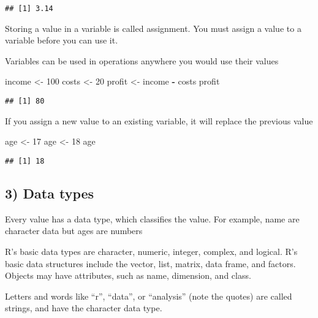 \documentclass[
]{article}
\newenvironment{Shaded}{\begin{snugshade}}{\end{snugshade}}
\newcommand{\DecValTok}[1]{\textcolor[rgb]{0.00,0.00,0.81}{#1}}
\newcommand{\NormalTok}[1]{#1}
\newcommand{\OperatorTok}[1]{\textcolor[rgb]{0.81,0.36,0.00}{\textbf{#1}}}
\newcommand{\StringTok}[1]{\textcolor[rgb]{0.31,0.60,0.02}{#1}}
\begin{document}
\begin{verbatim}
## [1] 3.14
\end{verbatim}

Storing a value in a variable is called assignment. You must assign a
value to a variable before you can use it.

Variables can be used in operations anywhere you would use their values

\begin{Shaded}
\begin{Highlighting}[]
\NormalTok{  income <-}\StringTok{ }\DecValTok{100}
\NormalTok{  costs <-}\StringTok{ }\DecValTok{20}
\NormalTok{  profit <-}\StringTok{ }\NormalTok{income }\OperatorTok{-}\StringTok{ }\NormalTok{costs}
\NormalTok{  profit}
\end{Highlighting}
\end{Shaded}

\begin{verbatim}
## [1] 80
\end{verbatim}

If you assign a new value to an existing variable, it will replace the
previous value

\begin{Shaded}
\begin{Highlighting}[]
\NormalTok{  age <-}\StringTok{ }\DecValTok{17}
\NormalTok{  age <-}\StringTok{ }\DecValTok{18}
\NormalTok{  age}
\end{Highlighting}
\end{Shaded}

\begin{verbatim}
## [1] 18
\end{verbatim}

\hypertarget{data-types}{%
\subsection{3) Data types}\label{data-types}}

Every value has a data type, which classifies the value. For example,
name are character data but ages are numbers

R's basic data types are character, numeric, integer, complex, and
logical. R's basic data structures include the vector, list, matrix,
data frame, and factors. Objects may have attributes, such as name,
dimension, and class.

Letters and words like ``r'', ``data'', or ``analysis'' (note the
quotes) are called strings, and have the character data type.
\end{document}
